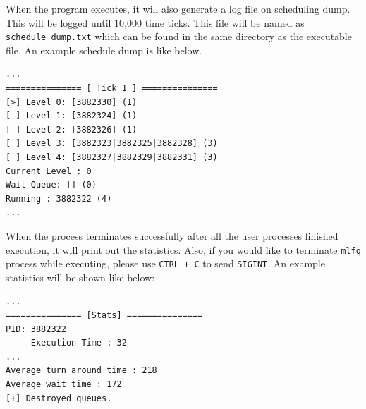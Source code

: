 \documentclass{homework}
\begin{document}
When the program executes, it will also generate a log file on scheduling dump. This will be logged until 10,000 time ticks. This file will be named as \texttt{schedule_dump.txt} which can be found in the same directory as the executable file. An example schedule dump is like below.
\\
\begin{center}
\begin{code}
\begin{verbatim}
...
=============== [ Tick 1 ] ===============
[>] Level 0: [3882330] (1)
[ ] Level 1: [3882324] (1)
[ ] Level 2: [3882326] (1)
[ ] Level 3: [3882323|3882325|3882328] (3)
[ ] Level 4: [3882327|3882329|3882331] (3)
Current Level : 0
Wait Queue: [] (0)
Running : 3882322 (4)
...
\end{verbatim}
\end{code}
\end{center}
When the process terminates successfully after all the user processes finished execution, it will print out the statistics. Also, if you would like to terminate \texttt{mlfq} process while executing, please use \texttt{CTRL + C} to send \texttt{SIGINT}. An example statistics will be shown like below:
\pagebreak
\begin{center}
\begin{code}
\begin{verbatim}
...
=============== [Stats] ===============
PID: 3882322
     Execution Time : 32
...
Average turn around time : 218
Average wait time : 172
[+] Destroyed queues.
\end{verbatim}
\end{code}
\end{center}
\label{sec:mlfqconclusion}
\end{document}
